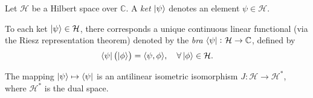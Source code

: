 \begin{definition}[Ket]
	Let $\mathcal{H}$ be a Hilbert space over $\mathbb{C}$. A \emph{ket} $\ket{\psi}$ denotes an element $\psi\in\mathcal{H}$.
\end{definition}

\begin{definition}[Bra]
	To each ket $\ket{\psi}\in\mathcal{H}$, there corresponds a unique continuous linear functional (via the Riesz representation theorem) denoted by the \emph{bra} $\bra{\psi}\colon\mathcal{H}\to\mathbb{C}$, defined by
	\[\bra{\psi}\left(\ket{\phi}\right)=\langle\psi,\phi\rangle,\quad\forall\ket{\phi}\in\mathcal{H}.\]
\end{definition}
\begin{remark}
The mapping $\ket{\psi}\mapsto\bra{\psi}$ is an antilinear isometric isomorphism $J:\mathcal{H}\to\mathcal{H}^*$, where $\mathcal{H}^*$ is the dual space.
\end{remark}

\newpage
%
%


